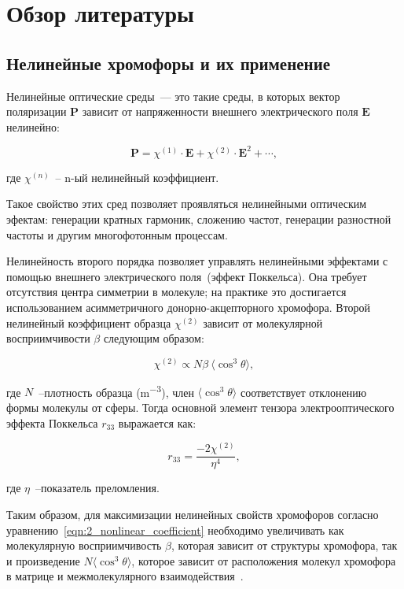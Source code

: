 \section{Обзор литературы}

\subsection{Нелинейные хромофоры и их применение}

Нелинейные оптические среды~--- это такие среды, в которых вектор поляризации $\mathbf{P}$ зависит от напряженности внешнего электрического поля $\mathbf{E}$ нелинейно:

\begin{equation}
    \mathbf{P} = \chi^{(1)}\cdot\mathbf{E} + \chi^{(2)}\cdot\mathbf{E}^2 + \cdots ,
\end{equation}

\noindent где $\chi^{(n)}$~-- n-ый нелинейный коэффициент.

Такое свойство этих сред позволяет проявляться нелинейными оптическим эфектам: генерации кратных гармоник, сложению частот, генерации разностной частоты и другим многофотонным процессам.

Нелинейность второго порядка позволяет управлять нелинейными эффектами с помощью внешнего электрического поля~(эффект Поккельса). Она требует отсутствия центра симметрии в молекуле; на практике это достигается использованием асимметричного донорно-акцепторного хромофора. Второй нелинейный коэффициент образца $\chi^{(2)}$ зависит от молекулярной восприимчивости $\beta$ следующим образом:

\begin{equation}
    \chi^{(2)} \propto N \beta\ \langle\cos^3\theta\rangle,
    \label{eqn:2_nonlinear_coefficient}
\end{equation}

\noindent где $N$~--плотность образца (\si{\metre^{-3}}), член $\langle \cos^3\theta\rangle$ соответствует отклонению формы молекулы от сферы. Тогда основной элемент тензора электрооптического эффекта Поккельса $r_{33}$ выражается как:

\begin{equation}
    r_{33} = \frac{-2\chi^{(2)}}{\eta^4},
\end{equation}

\noindent где $\eta$~--показатель преломления.

Таким образом, для максимизации нелинейных свойств хромофоров согласно уравнению~\ref{eqn:2_nonlinear_coefficient} необходимо увеличивать как молекулярную восприимчивость $\beta$, которая зависит от структуры хромофора, так и произведение $N\langle \cos^3\theta\rangle$, которое зависит от расположения молекул хромофора в матрице и межмолекулярного взаимодействия~\cite{Dalton2010a}. 


